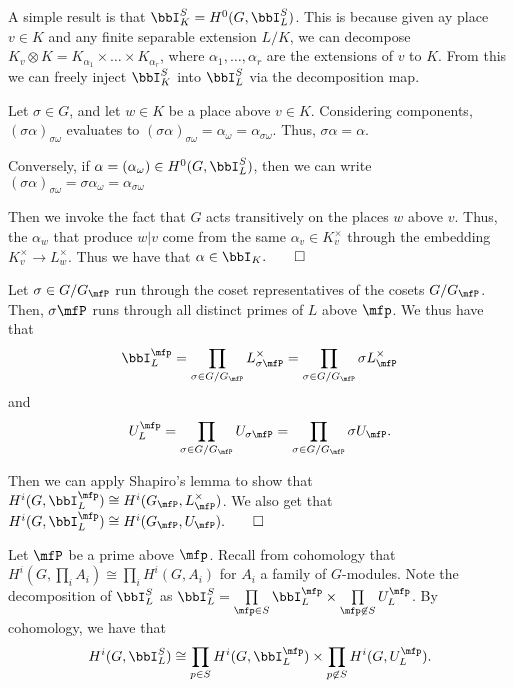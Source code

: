 \documentclass[a4paper, 12pt,oneside,openany]{book}
\begin{document}
A simple result is that $\bbI_K^S = H^0(G, \bbI_L^S)$. This is because given ay place $v \in K$ and any finite separable extension $L/K$, we can decompose $K_v \otimes K = K_{\alpha_1} \times \dots\times K_{\alpha_r}$, where $\alpha_1, \dots, \alpha_r$ are the extensions of $v$ to $K$. From this we can freely inject $\bbI_K^S$ into $\bbI_L^S$ via the decomposition map. 

Let $\sigma \in G$, and let $w \in K$ be a place above $v \in K$. Considering components, $(\sigma\alpha)_{\sigma\omega}$ evaluates to $(\sigma\alpha)_{\sigma\omega}=\alpha_\omega=\alpha_{\sigma\omega}$. Thus, $\sigma\alpha = \alpha$. 

Conversely, if $\alpha = (\alpha_\omega) \in H^0(G, \bbI_L^S)$, then we can write $(\sigma\alpha)_{\sigma\omega}=\sigma\alpha_\omega=\alpha_{\sigma\omega}$

Then we invoke the fact that $G$ acts transitively on the places $w$ above $v$. Thus, the $\alpha_w$ that produce $w|v$ come from the same $\alpha_v \in K_v^\times$ through the embedding $K_v^\times \to L_w^\times$. Thus we have that $\alpha \in \bbI_K. \qed$


 Let $\sigma \in G/G_\mfP$ run through the coset representatives of the cosets $G/G_\mfP$. Then, $\sigma \mfP$ runs through all distinct primes of $L$ above $\mfp$. We thus have that $$\bbI_L^\mfp = \prod\limits_{\sigma \in G/G_\mfP} L_{\sigma\mfP}^\times = \prod\limits_{\sigma \in G/G_\mfP} \sigma L_\mfP^\times$$ and $$U_L^\mfp = \prod\limits_{\sigma \in G/G_\mfP} U_{\sigma\mfP} = \prod\limits_{\sigma \in G/G_\mfP} \sigma U_\mfP.$$

Then we can apply Shapiro's lemma to show that $H^i(G, \bbI_L^\mfp) \cong H^i(G_\mfP, L_\mfP^\times)$. We also get that $H^i(G, \bbI_L^\mfp) \cong H^i(G_\mfP, U_\mfP). \qed$


 Let $\mfP$ be a prime above $\mfp$. Recall from cohomology that $H^i(G, \prod_i A_i) \cong \prod_i H^i(G, A_i)$ for $A_i$ a family of $G$-modules. Note the decomposition of $\bbI_L^S$ as $\bbI_L^S=\prod\limits_{\mfp \in S} \bbI_L^\mfp \times \prod\limits_{\mfp \not\in S} U_L^\mfp$. By cohomology, we have that $$H^i(G, \bbI_L^S) \cong \prod\limits_{p \in S} H^i(G, \bbI_L^\mfp)\times \prod\limits_{p \not\in S}H^i(G, U_L^\mfp).$$
\end{document}
